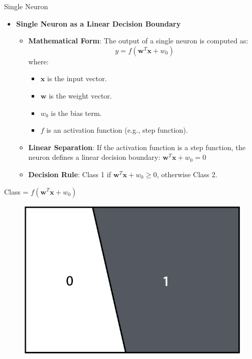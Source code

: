 \documentclass[serif, aspectratio=169]{beamer}
\begin{document}
\begin{frame}{Single Neuron}
    \begin{itemize}
        \item \textbf{Single Neuron as a Linear Decision Boundary}
        \medskip
        \begin{itemize}\itemsep1em
        \item \justifying \textbf{Mathematical Form}:
        The output of a single neuron is computed as:
        \[
        y = f(\mathbf{w}^T \mathbf{x} + w_0)
        \]
        where:
        \begin{itemize}
            \item \( \mathbf{x} \) is the input vector.
            \item \( \mathbf{w} \) is the weight vector.
            \item \( w_0 \) is the bias term.
            \item \( f \) is an activation function (e.g., step function).
        \end{itemize}
        
        \item \justifying \textbf{Linear Separation}: 
        If the activation function is a step function, the neuron defines a linear decision boundary:
        \(
        \mathbf{w}^T \mathbf{x} + w_0 = 0
        \)
        \item \textbf{Decision Rule}:
        Class 1 if \( \mathbf{w}^T \mathbf{x} + w_0 \geq 0 \), otherwise Class 2.
        \end{itemize}
    \end{itemize}
    \endminipage
    \hfill
        \centering Class = \(f(\mathbf{w}^T \mathbf{x} + w_0)\)
        \begin{figure}
            \centering
            \includegraphics[width=\linewidth]{pic/Figure_20.png}
        \end{figure}
    \endminipage
\end{frame}
\end{document}
